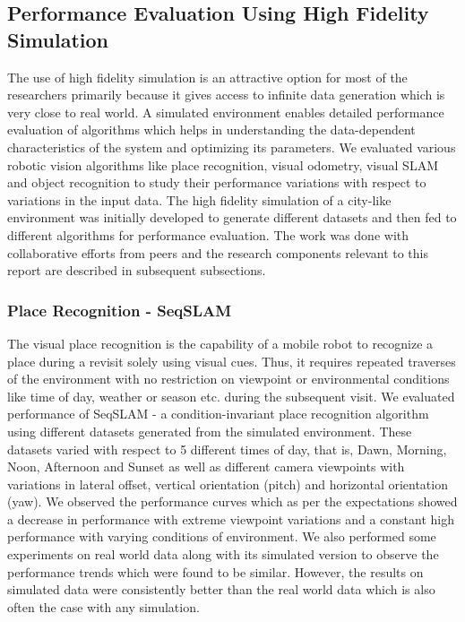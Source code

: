 \documentclass{article}
\begin{document}
\subsection{Performance Evaluation Using High Fidelity Simulation}
The use of high fidelity simulation is an attractive option for most of the researchers primarily because it gives access to infinite data generation which is very close to real world. A simulated environment enables detailed performance evaluation of algorithms which helps in understanding the data-dependent characteristics of the system and optimizing its parameters. We evaluated various robotic vision algorithms like place recognition, visual odometry, visual SLAM and object recognition to study their performance variations with respect to variations in the input data. The high fidelity simulation of a city-like environment was initially developed to generate different datasets and then fed to different algorithms for performance evaluation. The work was done with collaborative efforts from peers and the research components relevant to this report are described in subsequent subsections.

\subsubsection{Place Recognition - SeqSLAM}
The visual place recognition is the capability of a mobile robot to recognize a place during a revisit solely using visual cues. Thus, it requires repeated traverses of the environment with no restriction on viewpoint or environmental conditions like time of day, weather or season etc. during the subsequent visit. We evaluated performance of SeqSLAM - a condition-invariant place recognition algorithm using different datasets generated from the simulated environment. These datasets varied with respect to 5 different times of day, that is, Dawn, Morning, Noon, Afternoon and Sunset as well as different camera viewpoints with variations in lateral offset, vertical orientation (pitch) and horizontal orientation (yaw). We observed the performance curves which as per the expectations showed a decrease in performance with extreme viewpoint variations and a constant high performance with varying conditions of environment. We also performed some experiments on real world data along with its simulated version to observe the performance trends which were found to be similar. However, the results on simulated data were consistently better than the real world data which is also often the case with any simulation.
\end{document}
